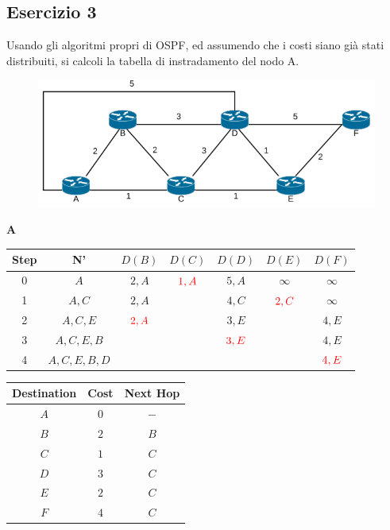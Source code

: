 \documentclass[10pt]{article}
\begin{document}
		\subsection{Esercizio 3}
			Usando gli algoritmi propri di OSPF, ed assumendo che i costi siano già stati distribuiti, si calcoli la tabella di instradamento del nodo A.
			\begin{figure}[h]
				\centering
				\includegraphics[width=13cm]{es3}
			\end{figure}
			\begin{center}
				\textbf{A}
				\begin{tabular}{||c c c c c c c||} 
					\hline
					Step & N' & $D(B)$ & $D(C)$ & $D(D)$ & $D(E)$ & $D(F)$ \\[0.5ex] 
					\hline\hline
					0 & $A$ & $2,A$ & $\color{red} 1,A$ & $5,A$ & $\infty$ & $\infty$ \\
					\hline
					1 & $A,C$ & $2,A$ & & $4,C$ & $\color{red} 2,C$ & $\infty$ \\
					\hline
					2 & $A,C,E$ & $\color{red} 2,A$ & & $3,E$ & & $4,E$ \\
					\hline
					3 & $A,C,E,B$ & & & $\color{red} 3,E$ & & $4,E$ \\
					\hline
					4 & $A,C,E,B,D$ & & & & & $\color{red} 4,E$ \\[0.5ex] 
					\hline
				\end{tabular}
				\quad
				\begin{tabular}{||c || c || c||}
					\hline
					Destination & Cost & Next Hop \\[0.5ex] 
					\hline\hline
					$A$ & $0$ & $-$ \\
					$B$ & $2$ & $B$ \\
					$C$ & $1$ & $C$ \\
					$D$ & $3$ & $C$ \\
					$E$ & $2$ & $C$ \\
					$F$ & $4$ & $C$ \\[0.5ex] 
					\hline
				\end{tabular}
			\end{center}
		
\end{document}
